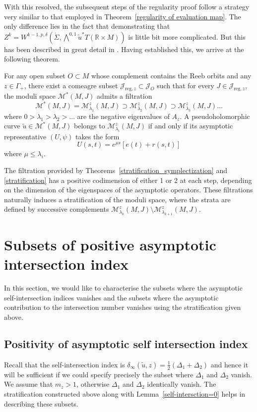 \documentclass[11pt, a4paper]{amsart}
\newcommand{\R}{\mathbb{R}}
\newcommand{\cJ}{\mathcal{J}}
\newcommand{\cM}{\mathcal{M}}
\begin{document}
With this resolved, the subsequent steps of the regularity proof follow a strategy very similar to that employed in Theorem~\ref{regularity of evaluation map}. The only difference lies in the fact that demonstrating that $Z^k=W^{k-1,p,\delta}\left(\dot{\Sigma}, \bigwedge\nolimits^{0,1}\tilde{u}^*T(\R \times M)\right)$ is little bit more complicated. But this has been described in great detail in \cite[Section~8.3]{SFTwendl}. Having established this, we arrive at the following theorem.

\begin{theorem} \label{stratification}
For any open subset $O\subset M$ whose complement contains the Reeb orbits and any $z\in \Gamma_+$, there exist a comeagre subset $\cJ_{\mathrm{reg},z} \subset \cJ_O$ such that for every $J \in \cJ_{\mathrm{reg},z}$, the moduli space $\cM^*(M,J)$ admits a filtration
$$\cM^*(M,J) = \cM^z_{\lambda_1}(M,J) \supset \cM^z_{\lambda_2}(M,J) \supset \cM^z_{\lambda_3}(M,J) \dots $$
where $0>\lambda_1> \lambda_2> \dots $ are the negative eigenvalues of $A_z$. A pseudoholomorphic curve $\tilde{u}\in \cM^*(M,J)$ belongs to $\cM^z_{\lambda_i}(M,J)$ if and only if its asymptotic representative $(U, \psi)$ takes the form
$$U(s, t) = e^{\mu s} [e(t) + r (s, t)]$$
where $\mu \leq \lambda_i$.
\end{theorem}

The filtration provided by Theorems~\ref{stratification_symplectization} and \ref{stratification} has a positive codimension of either 1 or 2 at each step, depending on the dimension of the eigenspaces of the asymptotic operators. These filtrations naturally induces a stratification of the moduli space, where the strata are defined by successive complements $\cM^z_{\lambda_k}(M,J) \setminus \cM^z_{\lambda_{k+1}}(M,J)$. 



\section{Subsets of positive asymptotic intersection index} \label{section: Subsets of positive asymptotic intersection index}

In this section, we would like to characterise the subsets where the asymptotic self-intersection indices vanishes and the subsets where the asymptotic contribution to the intersection number vanishes using the stratification given above.

\subsection{Positivity of asymptotic self intersection index}
Recall that the self-intersection index is $\delta_{\infty}(\tilde{u},z) =\frac{1}{2}(\Delta_1+\Delta_2)$ and hence it will be sufficient if we could specify precisely the subset where $\Delta_1$ and $\Delta_2$ vanish. We assume that $m_z>1$, otherwise $\Delta_1$ and $\Delta_2$ identically vanish. The stratification constructed above along with Lemma~\ref{self-intersction=0} helps in describing these subsets.\\
\end{document}
